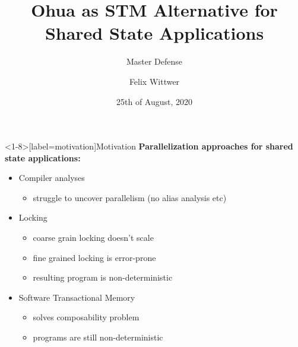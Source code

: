 \documentclass[aspectratio=169, usenames, dvipsnames]{beamer}
\title{Ohua as STM Alternative for Shared State Applications}
\subtitle{Master Defense}
\date{25th of August, 2020}
\author{Felix Wittwer}
\begin{document}
\begin{frame}
\titlepage
\end{frame}

\begin{frame}<1-8>[label=motivation]{Motivation}
    \textbf{Parallelization approaches for shared state applications:}\\

    \begin{itemize}
        \item<2-3> Compiler analyses
            \begin{itemize}
                \item<3> struggle to uncover parallelism (no alias analysis etc)
            \end{itemize}
        \item<4-7> Locking
            \begin{itemize}
                \item<5-7> coarse grain locking doesn't scale
                \item<6-7> fine grained locking is error-prone
                \item<7> resulting program is non-deterministic
            \end{itemize}
        \item<8-> Software Transactional Memory
            \begin{itemize}
                \item<9-> solves composability problem
                \item<10-> programs are still non-deterministic
            \end{itemize}
    \end{itemize}
\end{frame}

\end{document}
